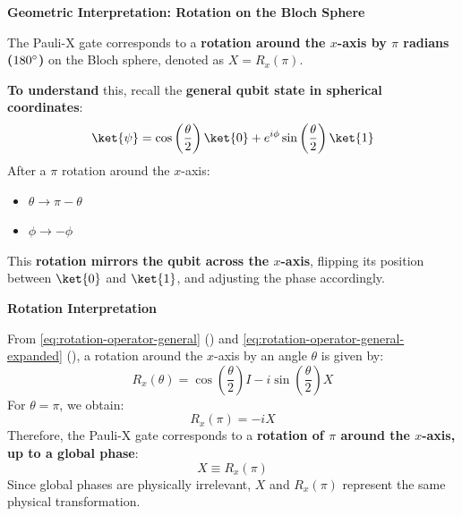 \highspace
\begin{flushleft}
   \textcolor{Green3}{ \textbf{Geometric Interpretation: Rotation on the Bloch Sphere}}
\end{flushleft}
The Pauli-X gate corresponds to a \textbf{rotation around the $x$-axis by $\pi$ radians ($180^\circ$)} on the Bloch sphere, denoted as $X = R_{x}(\pi)$.

\highspace
\textbf{To understand} this, recall the \textbf{general qubit state in spherical coordinates}:
\begin{equation*}
   \ket{\psi} = \cos\left(\dfrac{\theta}{2}\right) \ket{0} + e^{i \phi} \sin\left(\dfrac{\theta}{2}\right) \ket{1}
\end{equation*}
After a $\pi$ rotation around the $x$-axis:
\begin{itemize}
   \item $\theta \rightarrow \pi - \theta$
   \item $\phi \rightarrow -\phi$ 
\end{itemize}
This \textbf{rotation mirrors the qubit across the $x$-axis}, flipping its position between $\ket{0}$ and $\ket{1}$, and adjusting the phase accordingly.

\highspace
\begin{flushleft}
    \textcolor{Green3}{ \textbf{Rotation Interpretation}}
\end{flushleft}
From \autoref{eq:rotation-operator-general} () and \autoref{eq:rotation-operator-general-expanded} (), a rotation around the $x$-axis by an angle $\theta$ is given by:
\begin{equation*}
    R_x(\theta) = \cos\left(\frac{\theta}{2}\right) I - i \sin\left(\frac{\theta}{2}\right) X
\end{equation*}
For $\theta = \pi$, we obtain:
\begin{equation*}
    R_x(\pi) = -iX
\end{equation*}
Therefore, the Pauli-X gate corresponds to a \textbf{rotation of $\pi$ around the $x$-axis, up to a global phase}:
\begin{equation*}
    X \equiv R_x(\pi)
\end{equation*}
Since global phases are physically irrelevant, $X$ and $R_x(\pi)$ represent the same physical transformation.

